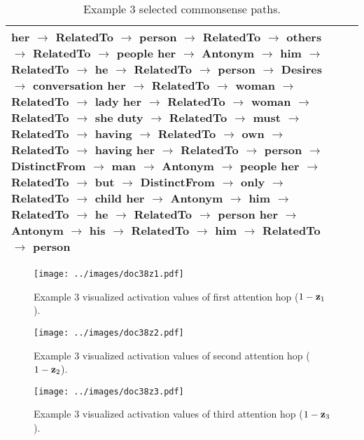 \documentclass[11pt,a4paper]{article}
\begin{document}
\begin{table*}[!h]
\begin{small}
\begin{tabular}{|p{}|p{}|}
{her $\rightarrow$ RelatedTo $\rightarrow$ person $\rightarrow$ RelatedTo $\rightarrow$ others $\rightarrow$ RelatedTo $\rightarrow$ people\\
her $\rightarrow$ Antonym $\rightarrow$ him $\rightarrow$ RelatedTo $\rightarrow$ he $\rightarrow$ RelatedTo $\rightarrow$ person $\rightarrow$ Desires $\rightarrow$ conversation\\
\textbf{her $\rightarrow$ RelatedTo $\rightarrow$ woman $\rightarrow$ RelatedTo $\rightarrow$ lady}\\
her $\rightarrow$ RelatedTo $\rightarrow$ woman $\rightarrow$ RelatedTo $\rightarrow$ she\\
duty $\rightarrow$ RelatedTo $\rightarrow$ must $\rightarrow$ RelatedTo $\rightarrow$ having $\rightarrow$ RelatedTo $\rightarrow$ own $\rightarrow$ RelatedTo $\rightarrow$ having\\
\textbf{her $\rightarrow$ RelatedTo $\rightarrow$ person $\rightarrow$ DistinctFrom $\rightarrow$ man $\rightarrow$ Antonym $\rightarrow$ people}\\
her $\rightarrow$ RelatedTo $\rightarrow$ but $\rightarrow$ DistinctFrom $\rightarrow$ only $\rightarrow$ RelatedTo $\rightarrow$ child\\
\textbf{her $\rightarrow$ Antonym $\rightarrow$ him $\rightarrow$ RelatedTo $\rightarrow$ he $\rightarrow$ RelatedTo $\rightarrow$ person}\\
\textbf{her $\rightarrow$ Antonym $\rightarrow$ his $\rightarrow$ RelatedTo $\rightarrow$ him $\rightarrow$ RelatedTo $\rightarrow$ person}\\
    } \\
    \hline
  \end{tabular}
 \caption{Example 3 selected commonsense paths.}
 \label{tab:extractedex3}
 \end{small}
\end{table*}
\begin{figure*}[h]
  \centering
  \texttt{[image: ../images/doc38z1.pdf]}
 \caption{Example 3 visualized activation values of first attention hop ($1 - {\bf z}_1$).}
\end{figure*}
\begin{figure*}[h]
  \centering
  \texttt{[image: ../images/doc38z2.pdf]}
 \caption{Example 3 visualized activation values of second attention hop ($1 - {\bf z}_2$).}
\end{figure*}
\begin{figure*}[h]
  \centering
  \texttt{[image: ../images/doc38z3.pdf]}
 \caption{Example 3 visualized activation values of third attention hop ($1 - {\bf z}_3$).}
\end{figure*} 
\end{document}
